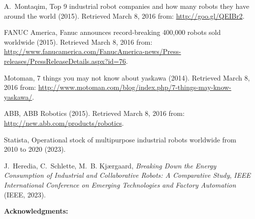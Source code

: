 \documentclass[12pt]{article}
\begin{document}
\begin{thebibliography}{10}
	A.~Montaqim, Top 9 industrial robot companies and how many robots they have
	around the world (2015). Retrieved March 8, 2016 from:
	\url{http://goo.gl/QEIBr2}.
	
	{\relax FANUC America}, Fanuc announces record-breaking 400,000 robots sold
	worldwide (2015). Retrieved March 8, 2016 from:
	\url{http://www.fanucamerica.com/FanucAmerica-news/Press-releases/PressReleaseDetails.aspx?id=76}.
	
	{\relax Motoman}, 7 things you may not know about yaskawa (2014). Retrieved
	March 8, 2016 from:
	\url{http://www.motoman.com/blog/index.php/7-things-may-know-yaskawa/}.
	
	{\relax ABB}, {ABB Robotics} (2015). Retrieved March 8, 2016 from:
	\url{http://new.abb.com/products/robotics}.
	
	Statista, Operational stock of multipurpose industrial robots worldwide from
	2010 to 2020 (2023).
	
	J.~Heredia, C.~Schlette, M.~B. Kj{\ae}rgaard, {\it Breaking Down the Energy
		Consumption of Industrial and Collaborative Robots: A Comparative Study\/},
	{\it IEEE International Conference on Emerging Technologies and Factory
		Automation\/} (IEEE, 2023).
	
\end{thebibliography}
\textbf{Acknowledgments:}
\end{document}
